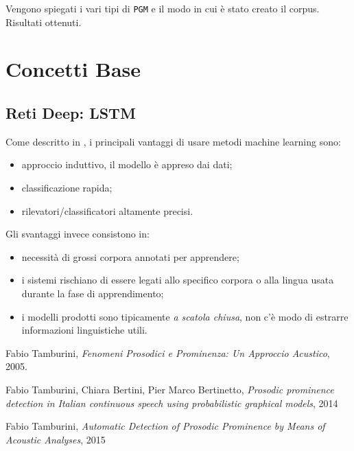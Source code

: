 \documentclass[twoside,twocolumn]{article}
\theoremstyle{definition}
\begin{document}
	Vengono spiegati i vari tipi di \texttt{PGM} e il modo in cui è stato creato il corpus. Risultati ottenuti.

\section{Concetti Base}
	\subsection{Reti Deep: LSTM}
		Come descritto in \cite{bib:prominence-by-acoustic-analyses}, i principali vantaggi di usare metodi machine learning sono:
		\begin{itemize}
			\item approccio induttivo, il modello è appreso dai dati;
			\item classificazione rapida;
			\item rilevatori/classificatori altamente precisi.
		\end{itemize}
		Gli svantaggi invece consistono in:
		\begin{itemize}
			\item necessità di grossi corpora annotati per apprendere;
			\item i sistemi rischiano di essere legati allo specifico corpora o alla lingua usata durante la fase di apprendimento;
			\item i modelli prodotti sono tipicamente \textit{a scatola chiusa}, non c'è modo di estrarre informazioni linguistiche utili.
		\end{itemize}
		
\begin{thebibliography}{99}	
		Fabio Tamburini,
		\newblock \emph{Fenomeni Prosodici e Prominenza: Un Approccio Acustico},
		2005.
	
		Fabio Tamburini, Chiara Bertini, Pier Marco Bertinetto,
		\newblock \emph{Prosodic prominence detection in Italian continuous speech using probabilistic graphical models},
		2014
		
		Fabio Tamburini,
		\newblock \emph{Automatic Detection of Prosodic Prominence by Means of Acoustic Analyses},
		2015
\end{thebibliography}
\end{document}
